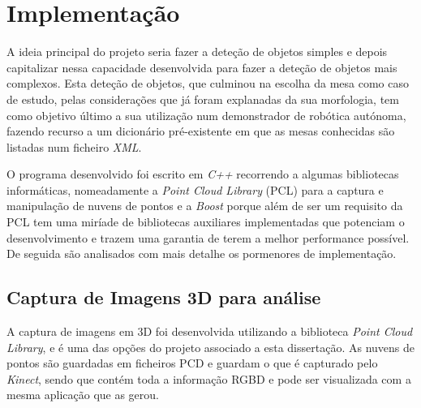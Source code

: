 \chapter{Implementação}\label{chap:chap4}



A ideia principal do projeto seria fazer a deteção de objetos simples e depois capitalizar nessa capacidade desenvolvida para fazer a deteção de objetos mais complexos. Esta deteção de objetos, que culminou na escolha da mesa como caso de estudo, pelas considerações que já foram explanadas da sua morfologia, tem como objetivo último a sua utilização num demonstrador de robótica autónoma, fazendo recurso a um dicionário pré-existente em que as mesas conhecidas são listadas num ficheiro \emph{XML}.

O programa desenvolvido foi escrito em \emph{C++} recorrendo a algumas bibliotecas informáticas, nomeadamente a \emph{Point Cloud Library} (PCL) para a captura e manipulação de nuvens de pontos e a \emph{Boost} porque além de ser um requisito da PCL tem uma miríade de bibliotecas auxiliares implementadas que potenciam o desenvolvimento e trazem uma garantia de terem a melhor performance possível. De seguida são analisados com mais detalhe os pormenores de implementação.

\section{Captura de Imagens 3D para análise }

A captura de imagens em 3D foi desenvolvida utilizando a biblioteca \emph{Point Cloud Library}, e é uma das opções do projeto associado a esta dissertação. As nuvens de pontos são guardadas em ficheiros PCD e guardam o que é capturado pelo \emph{Kinect}, sendo que contém toda a informação RGBD e pode ser visualizada com a mesma aplicação que as gerou.

